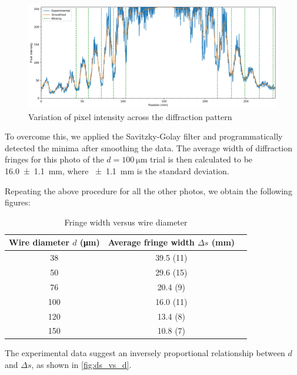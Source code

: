 \documentclass[a4paper, 12pt]{article}
\begin{document}
\begin{figure}[H]
    \includegraphics[width=\textwidth]{scripts/processed-data/intensity}
    \caption{Variation of pixel intensity across the diffraction pattern}
    \label{fig:intensity}
\end{figure}

To overcome this, we applied the Savitzky-Golay filter \autocite{scipy_smooth_filter} and programmatically detected the minima after smoothing the data. 
The average width of diffraction fringes for this photo of the $d = \SI{100}{\um}$ trial is then calculated to be \SI{16.0+-1.1}{\mm}, where \SI{+-1.1}{\mm} is the standard deviation.

Repeating the above procedure for all the other photos, we obtain the following figures:

\begin{table}[H]
    \centering
    \caption{Fringe width versus wire diameter}
    \begin{tabular}{ |c|c|c| }
        \hline
        \textbf{Wire diameter $d$} (\si{\um}) &
        \textbf{Average fringe width $\Delta s$} (\si{\mm}) \\
        \hline
\num{ 38 } & \num{ 39.5 (11) } \\ \hline
\num{ 50 } & \num{ 29.6 (15) } \\ \hline
\num{ 76 } & \num{ 20.4 (9) } \\ \hline
\num{ 100 } & \num{ 16.0 (11) } \\ \hline
\num{ 120 } & \num{ 13.4 (8) } \\ \hline
\num{ 150 } & \num{ 10.8 (7) } \\ \hline
    \end{tabular}
\end{table}

The experimental data suggest an inversely proportional relationship between $d$ and $\Delta s$, as shown in \cref{fig:ds_vs_d}.
\end{document}
